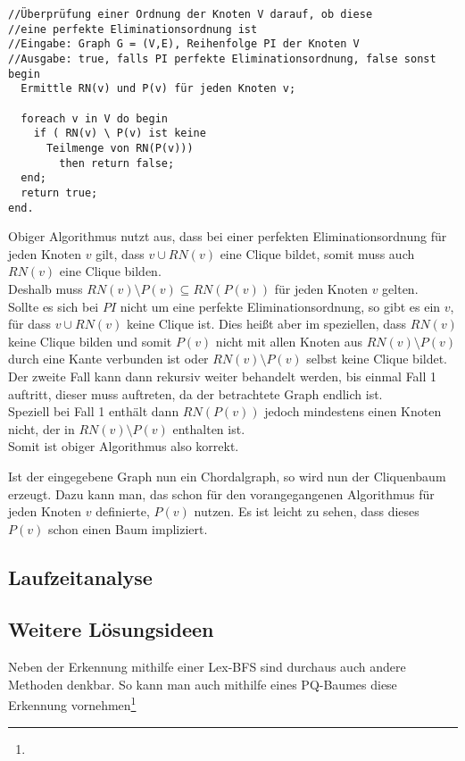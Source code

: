 \begin{lstlisting}
//Überprüfung einer Ordnung der Knoten V darauf, ob diese
//eine perfekte Eliminationsordnung ist
//Eingabe: Graph G = (V,E), Reihenfolge PI der Knoten V
//Ausgabe: true, falls PI perfekte Eliminationsordnung, false sonst
begin
  Ermittle RN(v) und P(v) für jeden Knoten v;
 
  foreach v in V do begin
    if ( RN(v) \ P(v) ist keine
      Teilmenge von RN(P(v)))
        then return false;
  end;
  return true;
end.
\end{lstlisting}

Obiger Algorithmus nutzt aus, dass bei einer perfekten Eliminationsordnung für jeden Knoten $v$ gilt, dass ${v} \cup RN(v)$ eine Clique bildet, somit muss auch $RN(v)$ eine Clique bilden.\\
Deshalb muss $RN(v) \setminus P(v) \subseteq RN(P(v))$ für jeden Knoten $v$ gelten.\\
Sollte es sich bei $PI$ nicht um eine perfekte Eliminationsordnung, so gibt es ein $v$, für dass ${v} \cup RN(v)$ keine Clique ist. Dies heißt aber im speziellen, dass $RN(v)$ keine Clique bilden und somit  $P(v)$ nicht mit allen Knoten aus $RN(v) \setminus P(v)$ durch eine Kante verbunden ist oder $RN(v) \setminus P(v)$ selbst keine Clique bildet. Der zweite Fall kann dann rekursiv weiter behandelt werden, bis einmal Fall 1 auftritt, dieser muss auftreten, da der betrachtete Graph endlich ist.\\
Speziell bei Fall 1 enthält dann $RN(P(v))$ jedoch mindestens einen Knoten nicht, der in $RN(v) \setminus P(v)$ enthalten ist.\\
Somit ist obiger Algorithmus also korrekt.

Ist der eingegebene Graph nun ein Chordalgraph, so wird nun der Cliquenbaum erzeugt. Dazu kann man, das schon für den vorangegangenen Algorithmus für jeden Knoten $v$ definierte, $P(v)$ nutzen. Es ist leicht zu sehen, dass dieses $P(v)$ schon einen Baum impliziert. 

\subsection{Laufzeitanalyse}


\subsection{Weitere Lösungsideen}

Neben der Erkennung mithilfe einer Lex-BFS sind durchaus auch andere Methoden denkbar. So kann man auch mithilfe eines PQ-Baumes diese Erkennung vornehmen\footnote{ }

